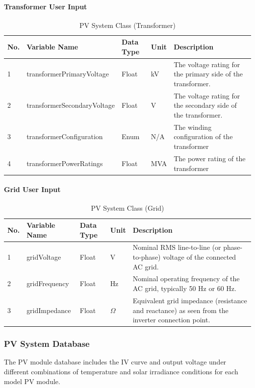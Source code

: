\documentclass{article}
\begin{document}
\paragraph{Transformer User Input}
\begin{table}[h]
\centering
\caption{PV System Class (Transformer)}
\begin{tabular}{|l|p{4cm}|l|l|p{5cm}|}
\hline
\textbf{No.} & \textbf{Variable Name} & \textbf{Data Type} & \textbf{Unit} & \textbf{Description} \\ \hline
1 & transformerPrimaryVoltage & Float & kV & The voltage rating for the primary side of the transformer. \\ \hline
2 & transformerSecondaryVoltage & Float & V & The voltage rating for the secondary side of the transformer. \\ \hline
3 & transformerConfiguration & Enum & N/A & The winding configuration of the transformer \\ \hline
4 & transformerPowerRatings & Float & MVA & The power rating of the transformer \\ \hline
\end{tabular}
\end{table}

\paragraph{Grid User Input}
\begin{table}[h]
\centering
\caption{PV System Class (Grid)}
\begin{tabular}{|l|l|l|l|p{6cm}|}
\hline
\textbf{No.} & \textbf{Variable Name} & \textbf{Data Type} & \textbf{Unit} & \textbf{Description} \\ \hline
1 & gridVoltage & Float & V & Nominal RMS line-to-line (or phase-to-phase) voltage of the connected AC grid. \\ \hline
2 & gridFrequency & Float & Hz & Nominal operating frequency of the AC grid, typically 50 Hz or 60 Hz. \\ \hline
3 & gridImpedance & Float & $\Omega$ & Equivalent grid impedance (resistance and reactance) as seen from the inverter connection point. \\ \hline
\end{tabular}
\end{table}

\subsubsection{PV System Database}
The PV module database includes the IV curve and output voltage under different combinations of temperature and solar irradiance conditions for each model PV module.
\end{document}

